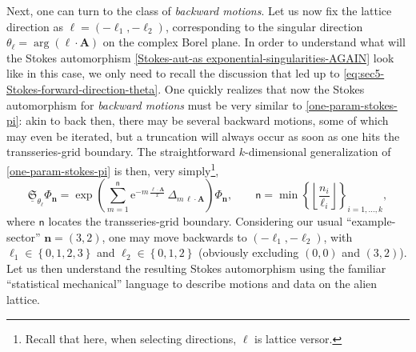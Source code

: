 \documentclass[11pt,a4paper]{article}
\newcommand{\rme}{{\mathrm{e}}}
\begin{document}
Next, one can turn to the class of \textit{backward motions}. Let us now fix the lattice direction as $\boldsymbol{\ell}=\left(-\ell_{1},-\ell_{2}\right)$, corresponding to the singular direction $\theta_{\boldsymbol{\ell}} = \arg \left( \boldsymbol{\ell} \cdot \boldsymbol{A} \right)$ on the complex Borel plane. In order to understand what will the Stokes automorphism \eqref{Stokes-aut-as exponential-singularities-AGAIN} look like in this case, we only need to recall the discussion that led up to \eqref{eq:sec5-Stokes-forward-direction-theta}. One quickly realizes that now the Stokes automorphism for \textit{backward motions} must be very similar to \eqref{one-param-stokes-pi}: akin to back then, there may be several backward motions, some of which may even be iterated, but a truncation will always occur as soon as one hits the transseries-grid boundary. The straightforward $k$-dimensional generalization of \eqref{one-param-stokes-pi} is then, very simply\footnote{Recall that here, when selecting directions, $\boldsymbol{\ell}$ is lattice versor.},
%
\begin{equation}
\label{eq:sec5-Stokes-backward-direction-theta}
\underline{\mathfrak{S}}_{\theta_{\boldsymbol{\ell}}} \Phi_{\boldsymbol{n}} = \exp\left( \sum_{m=1}^{\textsf{n}} \rme^{-m\, \frac{\boldsymbol{\ell} \cdot \boldsymbol{A}}{x}}\, \Delta_{m\,\boldsymbol{\ell} \cdot \boldsymbol{A}} \right) \Phi_{\boldsymbol{n}}, \qquad \textsf{n} = \min \left\{ \left\lfloor \frac{n_i}{\ell_i} \right\rfloor \right\}_{i=1,\ldots,k},
\end{equation}
%
\noindent
where $\textsf{n}$ locates the transseries-grid boundary. Considering our usual ``example-sector'' $\boldsymbol{n} = (3,2)$, one may move backwards to $\left( -\ell_{1}, -\ell_{2} \right)$, with $\ell_{1} \in \left\{ 0,1,2,3 \right\}$ and $\ell_{2} \in \left\{ 0,1,2 \right\}$ (obviously excluding $(0,0)$ and $(3,2)$). Let us then understand the resulting Stokes automorphism using the familiar ``statistical mechanical'' language to describe motions and data on the alien lattice.
%
\end{document}
